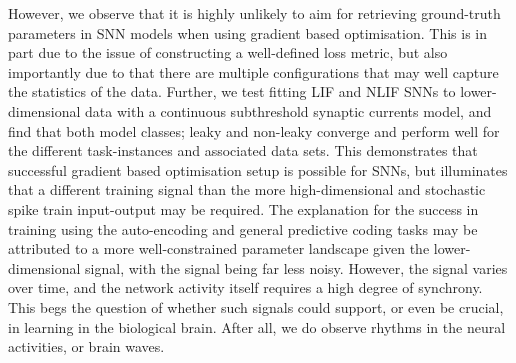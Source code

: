 \documentclass[mphil,deptreport,ianc]{infthesis} %
\begin{document}
However, we observe that it is highly unlikely to aim for retrieving ground-truth parameters in SNN models when using gradient based optimisation. 
This is in part due to the issue of constructing a well-defined loss metric, but also importantly due to that there are multiple configurations that may well capture the statistics of the data.
Further, we test fitting LIF and NLIF SNNs to lower-dimensional data with a continuous subthreshold synaptic currents model, and find that both model classes; leaky and non-leaky converge and perform well for the different task-instances and associated data sets.
This demonstrates that successful gradient based optimisation setup is possible for SNNs, but illuminates that a different training signal than the more high-dimensional and stochastic spike train input-output may be required. The explanation for the success in training using the auto-encoding and general predictive coding tasks may be attributed to a more well-constrained parameter landscape given the lower-dimensional signal, with the signal being far less noisy.
However, the signal varies over time, and the network activity itself requires a high degree of synchrony. This begs the question of whether such signals could support, or even be crucial, in learning in the biological brain. After all, we do observe rhythms in the neural activities, or brain waves.
\end{document}

